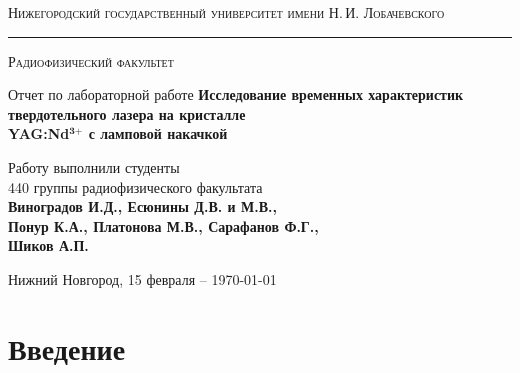 \documentclass[a4paper,14pt]{extarticle}
\begin{document}
\begin{titlepage}
\begin{center}
{\small\textsc{Нижегородский государственный университет имени Н.\,И. Лобачевского}}
\vskip 2pt \hrule \vskip 3pt
{\small\textsc{Радиофизический факультет}}

\vfill


{{\large Отчет по лабораторной работе}\vskip 12pt {\LARGE \bfseries Исследование временных характеристик \\[-0.05em] твердотельного лазера на кристалле \\[0.1em] YAG:Nd${}^{\mathbf{3\texttt{+}}}$ с ламповой накачкой}}

	
\vspace{2cm}
{\large Работу выполнили студенты \\[-0.25em] 440 группы радиофизического факультата \\[0.5em] {\Large \bfseries Виноградов И.Д., Есюнины Д.В. и М.В., \\  Понур К.А., Платонова М.В., Сарафанов Ф.Г., \\[0.2em] Шиков А.П.}}



\end{center}

\vfill
	
	
	
\begin{center}
	{Нижний Новгород, 15 февраля -- \today}
\end{center}

\end{titlepage}
\tableofcontents
\newpage



\section*{Введение}
\end{document}
